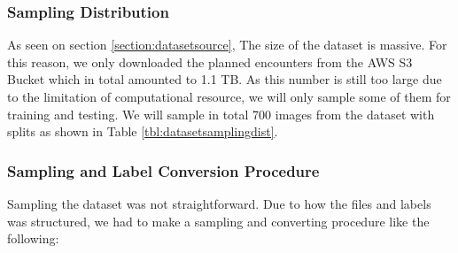     \subsubsection{Sampling Distribution}
    As seen on section \ref{section:datasetsource}, The size of the dataset is massive.
    For this reason, we only downloaded the planned encounters from the AWS S3 Bucket which 
    in total amounted to 1.1 TB. As this number is still too large
    due to the limitation of computational resource, we will only sample some of them
    for training and testing. We will sample in total 700 images from the dataset with splits
    as shown in Table \ref{tbl:datasetsamplingdist}.
    \begin{table}
      \centering
      \label{tbl:datasetsamplingdist}
      
    \end{table}
    
    \subsubsection{Sampling and Label Conversion Procedure}
    Sampling the dataset was not straightforward. Due to how the \textcite{aot_dataset} files and labels was structured,
    we had to make a sampling and converting procedure like the following:

